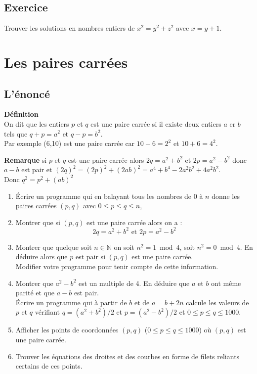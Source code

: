 \documentclass[a4paper,11pt]{book}
\newcommand{\N}{{\mathbb{N}}}
\begin{document}
\subsection{Exercice}
Trouver les solutions en nombres entiers de $x^2=y^2+z^2$ avec $x=y+1$.
\section{Les paires carr\'ees}
\subsection{L'\'enonc\'e}
{\bf D\'efinition} \\
On dit que les entiers $p$ et $q$ est une paire carr\'ee si il existe deux 
entiers $a$ er $b$ tels que $q+p=a^2$ et $q-p=b^2$.\\
Par exemple (6,10) est une paire carr\'ee car $10-6=2^2$ et $10+6=4^2$.

{\bf Remarque} si $p$ et $q$ est une paire carr\'ee alors $2q=a^2+b^2$ et
$2p=a^2-b^2$ donc $a-b$ est pair et
$(2q)^2=(2p)^2+(2ab)^2=a^4+b^4-2a^2b^2+4a^2b^2$.\\
Donc $q^2=p^2+(ab)^2$
\begin{enumerate}
\item \'Ecrire un programme qui en balayant tous les nombres de 0 \`a $n$ 
donne les paires carr\'ees $(p,q)$ avec $0 \leq p \leq q \leq n$,
\item Montrer que si $(p,q)$ est une paire carr\'ee alors on a :
$$2q=a^2+b^2 \mbox{ et } 2p=a^2-b^2$$
\item Montrer que quelque soit $n \in \N$ on soit $n^2=1 \bmod 4$, 
soit $n^2=0 \bmod 4$. En d\'eduire alors que $p$ est pair si $(p,q)$ est une 
paire carr\'ee.\\
Modifier votre programme pour tenir compte de cette information.
\item Montrer que $a^2-b^2$ est un multiple de 4. En d\'eduire que
$a$ et $b$ ont m\^eme parit\'e et que $a-b$ est pair. \\
\'Ecrire un programme qui \`a partir de $b$ et de $a=b+2n$ calcule les valeurs
de $p$ et $q$ v\'erifiant  $q=(a^2+b^2)/2$ et $p=(a^2-b^2)/2$  et 
$0 \leq p \leq q \leq 1000$.
\item Afficher les points de coordonn\'ees $(p,q)$ 
($0 \leq p \leq q \leq 1000$) o\`u $(p,q)$ est une paire carr\'ee.
\item Trouver les \'equations des droites et des courbes en forme de filets
reliants certains de ces points.
\end{enumerate}
\end{document}
